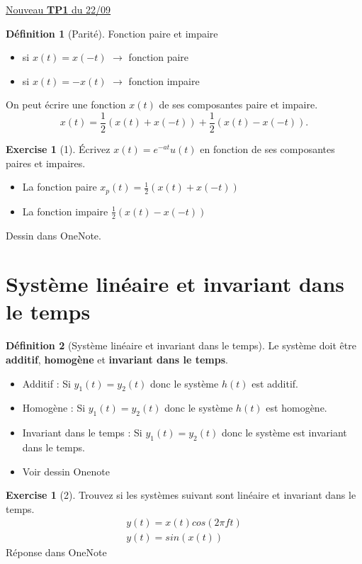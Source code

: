 \documentclass{article}
\theoremstyle{plain}%
\theoremstyle{definition}
\newtheorem{defn}{Définition}[section]
\newtheorem{xca}[exmp]{Exercise}
\theoremstyle{remark}
\begin{document}
\underline{Nouveau \textbf{TP1} du 22/09} \\

\begin{defn}[Parité]
    Fonction paire et impaire 
    \begin{itemize}
        \item si $ x(t) = x(-t) $ $\rightarrow$ fonction paire
        \item si $ x(t) = -x(t) $ $\rightarrow$ fonction impaire
    \end{itemize}
    On peut écrire une fonction $ x(t) $ de ses composantes paire et impaire.
    \[
        x(t) = \frac{1}{2}(x(t) + x(-t)) + \frac{1}{2}(x(t) - x(-t))
    .\]
\end{defn}


\begin{xca}[1]
    Écrivez $ x(t) = e^{-at}u(t)$ en fonction de ses composantes paires et impaires. \begin{itemize}
        \item La fonction paire $ x_p(t) = \frac{1}{2}(x(t) + x(-t)) $ 
        \item La fonction impaire $ \frac{1}{2} (x(t) - x(-t)) $ 
    \end{itemize}
    Dessin dans OneNote.
\end{xca}

\section{Système linéaire et invariant dans le temps}
\begin{defn}[Système linéaire et invariant dans le temps]
    Le système doit être \textbf{additif}, \textbf{homogène} et \textbf{invariant dans le temps}. \begin{itemize}
        \item Additif : Si $ y_1(t) = y_2(t) $ donc le système $ h(t) $ est additif.
        \item Homogène : Si $ y_1(t) = y_2(t) $ donc le système $ h(t) $ est homogène.
        \item Invariant dans le temps : Si $ y_1(t) = y_2(t) $ donc le système est invariant dans le temps.
        \item Voir dessin Onenote
    \end{itemize}
\end{defn}

\begin{xca}[2]
    Trouvez si les systèmes suivant sont linéaire et invariant dans le temps.\begin{align}
        y(t) = x(t)cos(2 \pi ft)\\
        y(t) = sin(x(t))
    \end{align}
    Réponse dans OneNote
\end{xca}
\end{document}
